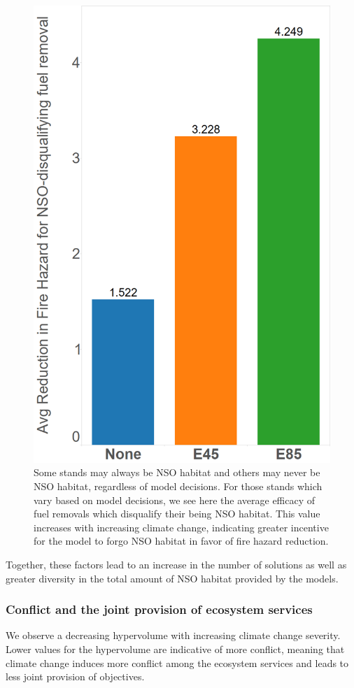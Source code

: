 \begin{figure}[ht]
\centering
\includegraphics[width=.5\textwidth]{../images/AvgFireHazardEffectivenessForNSODQs}
\caption[Efficacy of fuel removals for NSO habitat disqualification]{Some stands may always be NSO habitat and others may never be NSO habitat, regardless of model decisions. For those stands which vary based on model decisions, we see here the average efficacy of fuel removals which disqualify their being NSO habitat. This value increases with increasing climate change, indicating greater incentive for the model to forgo NSO habitat in favor of fire hazard reduction.}
\label{fig:nsoHabDQFHEfficacy}
\end{figure}

Together, these factors lead to an increase in the number of solutions as well as greater diversity in the total amount of NSO habitat provided by the models.


\subsubsection{Conflict and the joint provision of ecosystem services}
We observe a decreasing hypervolume with increasing climate change severity. Lower values for the hypervolume are indicative of more conflict, meaning that climate change induces more conflict among the ecosystem services and leads to less joint provision of objectives.

